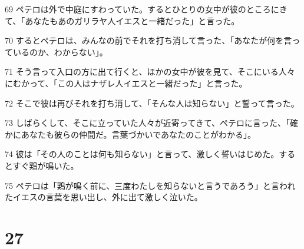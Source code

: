 \par 69 ペテロは外で中庭にすわっていた。するとひとりの女中が彼のところにきて、「あなたもあのガリラヤ人イエスと一緒だった」と言った。
\par 70 するとペテロは、みんなの前でそれを打ち消して言った、「あなたが何を言っているのか、わからない」。
\par 71 そう言って入口の方に出て行くと、ほかの女中が彼を見て、そこにいる人々にむかって、「この人はナザレ人イエスと一緒だった」と言った。
\par 72 そこで彼は再びそれを打ち消して、「そんな人は知らない」と誓って言った。
\par 73 しばらくして、そこに立っていた人々が近寄ってきて、ペテロに言った、「確かにあなたも彼らの仲間だ。言葉づかいであなたのことがわかる」。
\par 74 彼は「その人のことは何も知らない」と言って、激しく誓いはじめた。するとすぐ鶏が鳴いた。
\par 75 ペテロは「鶏が鳴く前に、三度わたしを知らないと言うであろう」と言われたイエスの言葉を思い出し、外に出て激しく泣いた。

\chapter{27}

